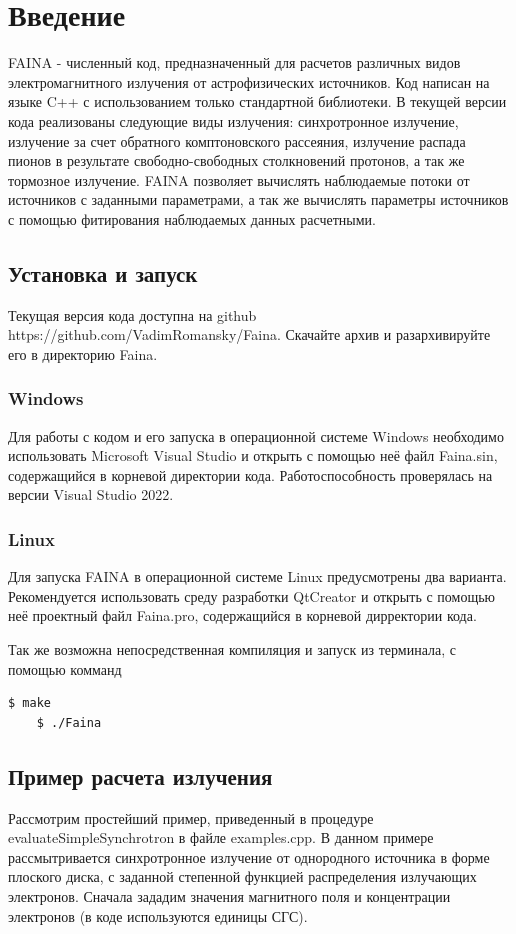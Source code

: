 \chapter*{Введение}		
FAINA - численный код, предназначенный для расчетов различных видов электромагнитного излучения от астрофизических источников. Код написан на языке C++ с использованием только стандартной библиотеки. В текущей версии кода реализованы следующие виды излучения: синхротронное излучение, излучение за счет обратного комптоновского рассеяния, излучение распада пионов в результате свободно-свободных столкновений протонов, а так же тормозное излучение. FAINA позволяет вычислять наблюдаемые потоки от источников с заданными параметрами, а так же вычислять параметры источников с помощью фитирования наблюдаемых данных расчетными.

\section*{Установка и запуск}
Текущая версия кода доступна на github https://github.com/VadimRomansky/Faina. Скачайте архив и разархивируйте его в директорию Faina.
\subsection*{Windows}
Для работы с кодом и его запуска в операционной системе Windows необходимо использовать Microsoft Visual Studio и открыть с помощью неё файл Faina.sin, содержащийся в корневой директории кода. Работоспособность проверялась на версии Visual Studio 2022.
\subsection*{Linux}
Для запуска FAINA в операционной системе Linux предусмотрены два варианта. Рекомендуется использовать среду разработки QtCreator и открыть с помощью неё проектный файл Faina.pro, содержащийся в корневой дирректории кода. 

Так же возможна непосредственная компиляция и запуск из терминала, с помощью комманд
\begin{lstlisting}[language=bash]
	$ make
	$ ./Faina
\end{lstlisting}
\section*{Пример расчета излучения}\label{quickStart}
Рассмотрим простейший пример, приведенный в процедуре evaluateSimpleSynchrotron в файле examples.cpp. В данном примере рассмытривается синхротронное излучение от однородного источника в форме плоского диска, с заданной степенной функцией распределения излучающих электронов. Сначала зададим значения магнитного поля и концентрации электронов (в коде используются единицы СГС).


